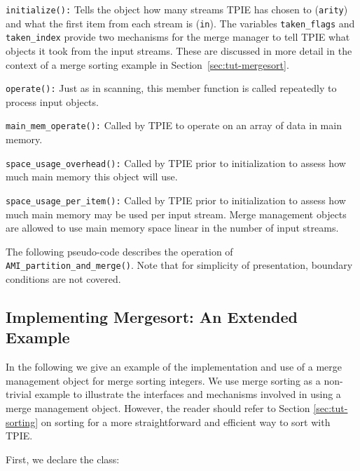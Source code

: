 \begin{description}
    \item\lstinline|initialize():| Tells the object how many
    streams TPIE has chosen to (\lstinline|arity|) and what the
    first item from each stream is (\lstinline|in|). The
    variables \lstinline|taken_flags| and
    \lstinline|taken_index| provide two mechanisms for the
    merge manager to tell TPIE what objects it took from the
    input streams. These are discussed in more detail in the
    context of a merge sorting example in
    Section~\ref{sec:tut-mergesort}.
    \item\lstinline|operate():| Just as in scanning, this
    member function is called repeatedly to process input
    objects.
    \item\lstinline|main_mem_operate():| Called by TPIE to
    operate on an array of data in main memory.
    \item\lstinline|space_usage_overhead():| Called by TPIE
    prior to initialization to assess how much main memory
    this object will use.
    \item\lstinline|space_usage_per_item():| Called by TPIE
    prior to initialization to assess how much main memory
    may be used per input stream. Merge management objects
    are allowed to use main memory space linear in the
    number of input streams.
\end{description}

The following pseudo-code describes the operation of
\lstinline|AMI_partition_and_merge()|.  Note that for
simplicity of presentation, boundary conditions are not
covered.



\subsection{Implementing Mergesort: An Extended Example}

In the following we give an example of the implementation and
use of a merge management object for merge sorting integers.
We use merge sorting as a non-trivial example to illustrate
the interfaces and mechanisms involved in using a merge
management object. However, the reader should refer to
Section \ref{sec:tut-sorting} on sorting for a more
straightforward and efficient way to sort with TPIE.

First, we declare the class:

